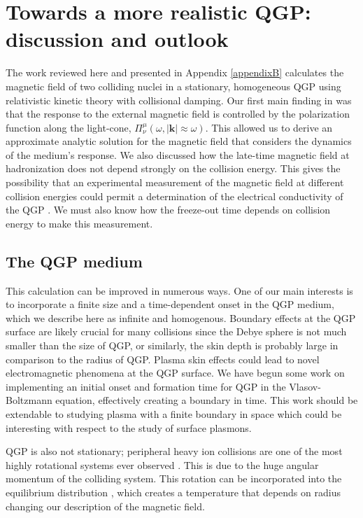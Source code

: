 
\section{Towards a more realistic QGP: discussion and outlook }\label{sec:ConclusionsQGP}
The work reviewed here and presented in Appendix \ref{appendixB} calculates the magnetic field of two colliding nuclei in a stationary, homogeneous QGP using relativistic kinetic theory with collisional damping. Our first main finding in \cite{Grayson:2022asf} was that the response to the external magnetic field is controlled by the polarization function along the light-cone, $\Pi^\mu_\nu(\omega ,|\boldsymbol{k}|\approx\omega)$. This allowed us to derive an approximate analytic solution for the magnetic field that considers the dynamics of the medium's response. We also discussed how the late-time magnetic field at hadronization does not depend strongly on the collision energy. This gives the possibility that an experimental measurement of the magnetic field at different collision energies could permit a determination of the electrical conductivity of the QGP \cite{PhysRevX.14.011028}. We must also know how the freeze-out time depends on collision energy to make this measurement.

\subsection{The QGP medium}
This calculation can be improved in numerous ways. One of our main interests is to incorporate a finite size and a time-dependent onset in the QGP medium, which we describe here as infinite and homogenous. Boundary effects at the QGP surface are likely crucial for many collisions since the Debye sphere is not much smaller than the size of QGP, or similarly, the skin depth is probably large in comparison to the radius of QGP. Plasma skin effects could lead to novel electromagnetic phenomena at the QGP surface. We have begun some work on implementing an initial onset and formation time for QGP in the Vlasov-Boltzmann equation, effectively creating a boundary in time. This work should be extendable to studying plasma with a finite boundary in space which could be interesting with respect to the study of surface plasmons.

QGP is also not stationary; peripheral heavy ion collisions are one of the most highly rotational systems ever observed \cite{PhysRevC.87.034906, PhysRevC.93.064907,PhysRevC.94.044910, doi:10.1146/annurev-nucl-021920-095245}. This is due to the huge angular momentum of the colliding system. This rotation can be incorporated into the equilibrium distribution \cite{Hakim2011}, which creates a temperature that depends on radius \cite{chernikov1964equilibrium} changing our description of the magnetic field.

